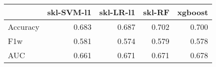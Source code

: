 \begin{tabular}{lrrrr}
\toprule
{} &  skl-SVM-l1 &  skl-LR-l1 &  skl-RF &  xgboost \\
\midrule
Accuracy &       0.683 &      0.687 &   0.702 &    0.700 \\
F1w      &       0.581 &      0.574 &   0.579 &    0.578 \\
AUC      &       0.661 &      0.671 &   0.671 &    0.678 \\
\bottomrule
\end{tabular}
